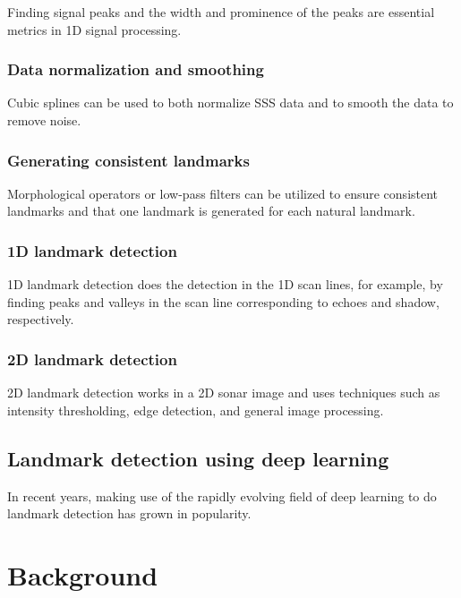 Finding signal peaks and the width and prominence of the peaks are essential metrics in 1D signal processing. 

\subsubsection{Data normalization and smoothing}

Cubic splines can be used to both normalize SSS data and to smooth the data to remove noise. 

\subsubsection{Generating consistent landmarks}

Morphological operators or low-pass filters can be utilized to ensure consistent landmarks and that one landmark is generated for each natural landmark.

\subsubsection{1D landmark detection}

1D landmark detection does the detection in the 1D scan lines, for example, by finding peaks and valleys in the scan line corresponding to echoes and shadow, respectively.

\subsubsection{2D landmark detection}

2D landmark detection works in a 2D sonar image and uses techniques such as intensity thresholding, edge detection, and general image processing.

\subsection{Landmark detection using deep learning}

In recent years, making use of the rapidly evolving field of deep learning to do landmark detection has grown in popularity.









\section{Background}

